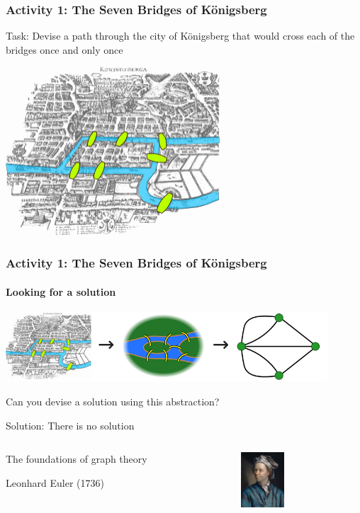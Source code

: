 \documentclass[xcolor=x11names,handout]{beamer}
\begin{document}
\begin{frame}
\frametitle{Activity 1: The Seven Bridges of K\"onigsberg}

\alert{Task}: Devise a path through the city of K\"onigsberg that would cross
each of the bridges once and only once

\begin{center}
 \includegraphics[width=80mm]{img/Konigsberg_bridges.png}
\end{center}
\end{frame}

\begin{frame}
 \frametitle{Activity 1: The Seven Bridges of K\"onigsberg}
\framesubtitle{Looking for a solution}							\pause

\begin{center}
\includegraphics[width=120mm]{img/Konigsberg_bridges_graph.png}
\end{center}
\bigskip 								\pause

Can you devise a solution using this \alert{abstraction}?
\bigskip 								\pause

\alert{Solution}: There is no solution 				\pause


\begin{columns}
\begin{column}{0.45\textwidth}

The foundations of graph theory

Leonhard Euler (1736)
\end{column}
\begin{column}{0.4\textwidth}

\includegraphics[width=16mm]{img/371px-Leonhard_Euler.jpeg}
\end{column}
\end{columns}
\end{frame}
\end{document}
